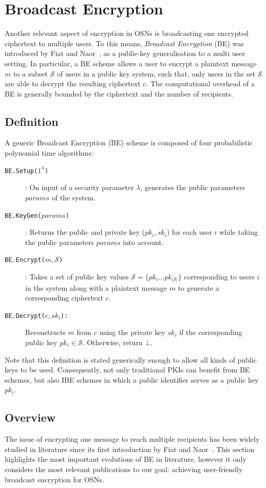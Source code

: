 \section{Broadcast Encryption}
Another relevant aspect of encryption in OSNs is broadcasting one encrypted ciphertext to multiple users. To this means, \textit{Broadcast Encryption} (BE) was introduced by Fiat and Naor~\cite{art:FiatN93}, as a public-key generalisation to a multi user setting. In particular, a BE scheme allows a user to encrypt a plaintext message $m$ to a subset $\mathcal{S}$ of users in a public key system, such that, only users in the set $\mathcal{S}$ are able to decrypt the resulting ciphertext $c$. The computational overhead of a BE is generally bounded by the ciphertext and the number of recipients.

\subsection{Definition}
A generic Broadcast Encryption (BE) scheme is composed of four probabilistic polynomial time algorithms:

\begin{description}
    \item[\texttt{BE.Setup($1^{\lambda}$)}]: On input of a security parameter $\lambda$, generates the public parameters $params$ of the system.
    \item[\texttt{BE.KeyGen($params$)}]: Returns the public and private key ($pk_i,sk_i$) for each user $i$ while taking the public parameters $params$ into account.
    \item[\texttt{BE.Encrypt($m, \mathcal{S}$)}]: Takes a set of public key values $\mathcal{S}=\{pk_i \ldots pk_{|\mathcal{S}|}\}$ corresponding to users $i$ in the system along with a plaintext message $m$ to generate a corresponding ciphertext $c$.
    \item[\texttt{BE.Decrypt($c, sk_i$):}] Reconstructs $m$ from $c$ using the private key $sk_i$ if the corresponding public key $pk_i \in \mathcal{S}$. Otherwise, return $\bot$.
\end{description}

Note that this definition is stated generically enough to allow all kinds of public keys to be used. Consequently, not only traditional PKIs can benefit from BE schemes, but also IBE schemes in which a public identifier  serves as a public key $pk_i$.

\subsection{Overview}
\label{sec:evolution_of_be}
The issue of encrypting one message to reach multiple recipients has been widely studied in literature since its first introduction by Fiat and Naor~\cite{art:FiatN93}. This section highlights the most important evolutions of BE in literature, however it only considers the most relevant publications to our goal: achieving user-friendly broadcast encryption for OSNs.

